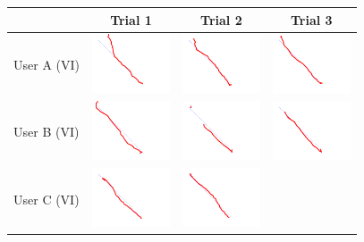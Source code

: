 \begin{tabular}{lccc}
\toprule
 & Trial 1 & Trial 2 & Trial 3\\
\midrule
 User A (VI)&
\includegraphics[width=2.3cm]{../experiments/line_Ayaka5_0.png} &
\includegraphics[width=2.3cm]{../experiments/line_Ayaka5_1.png} &
\includegraphics[width=2.3cm]{../experiments/line_Ayaka5_2.png} \\
\midrule
 User B (VI)&
\includegraphics[width=2.3cm]{../experiments/line_Takeyo_0.png} &
\includegraphics[width=2.3cm]{../experiments/line_Takeyo_1.png} &
\includegraphics[width=2.3cm]{../experiments/line_Takeyo_2.png} \\
\midrule
 User C (VI)&
\includegraphics[width=2.3cm]{../experiments/line_Angus_0.png} &
\includegraphics[width=2.3cm]{../experiments/line_Angus_1.png} &

\end{tabular}
